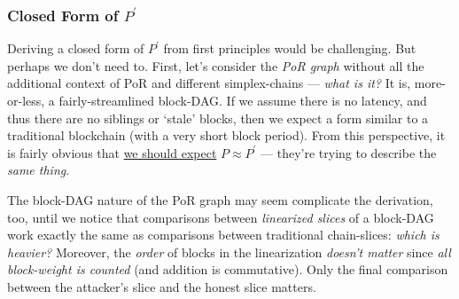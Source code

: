 \subsubsection{Closed Form of \texorpdfstring{$P^\prime$}{P'}}

Deriving a closed form of $P^\prime$ from first principles would be challenging.
But perhaps we don't need to.
First, let's consider the \emph{PoR graph} without all the additional context of PoR and different simplex-chains --- \emph{what is it?}
It is, more-or-less, a fairly-streamlined block-DAG.
If we assume there is no latency, and thus there are no siblings or `stale' blocks, then we expect a form similar to a traditional blockchain (with a very short block period).
From this perspective, it is fairly obvious that \ul{we should expect} $P \approx P^\prime$ --- they're trying to describe the \emph{same thing}.

The block-DAG nature of the PoR graph may seem complicate the derivation, too, until we notice that comparisons between \emph{linearized slices} of a block-DAG work exactly the same as comparisons between traditional chain-slices: \emph{which is heavier?}
Moreover, the \emph{order} of blocks in the linearization \emph{doesn't matter} since \emph{all block-weight is counted} (and addition is commutative).
Only the final comparison between the attacker's slice and the honest slice matters.

